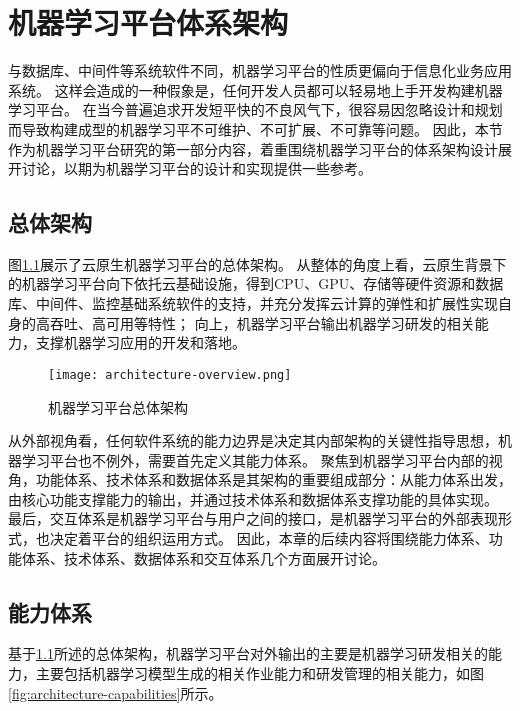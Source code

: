 
\chapter{机器学习平台体系架构}
\label{chap:architecture}

与数据库、中间件等系统软件不同，机器学习平台的性质更偏向于信息化业务应用系统。
这样会造成的一种假象是，任何开发人员都可以轻易地上手开发构建机器学习平台。
在当今普遍追求开发短平快的不良风气下，很容易因忽略设计和规划而导致构建成型的机器学习平不可维护、不可扩展、不可靠等问题。
因此，本节作为机器学习平台研究的第一部分内容，着重围绕机器学习平台的体系架构设计展开讨论，以期为机器学习平台的设计和实现提供一些参考。


\section{总体架构}
\label{sec:architecture-overview}

图\ref{fig:architecture-overview}展示了云原生机器学习平台的总体架构。
从整体的角度上看，云原生背景下的机器学习平台向下依托云基础设施，得到CPU、GPU、存储等硬件资源和数据库、中间件、监控基础系统软件的支持，并充分发挥云计算的弹性和扩展性实现自身的高吞吐、高可用等特性；
向上，机器学习平台输出机器学习研发的相关能力，支撑机器学习应用的开发和落地。

\begin{figure}
  \centering
  \texttt{[image: architecture-overview.png]}
  \caption{机器学习平台总体架构}
  \label{fig:architecture-overview}
\end{figure}

从外部视角看，任何软件系统的能力边界是决定其内部架构的关键性指导思想，机器学习平台也不例外，需要首先定义其能力体系。
聚焦到机器学习平台内部的视角，功能体系、技术体系和数据体系是其架构的重要组成部分：从能力体系出发，由核心功能支撑能力的输出，并通过技术体系和数据体系支撑功能的具体实现。
最后，交互体系是机器学习平台与用户之间的接口，是机器学习平台的外部表现形式，也决定着平台的组织运用方式。
因此，本章的后续内容将围绕能力体系、功能体系、技术体系、数据体系和交互体系几个方面展开讨论。


\section{能力体系}

基于\ref{sec:architecture-overview}所述的总体架构，机器学习平台对外输出的主要是机器学习研发相关的能力，主要包括机器学习模型生成的相关作业能力和研发管理的相关能力，如图\ref{fig:architecture-capabilities}所示。

